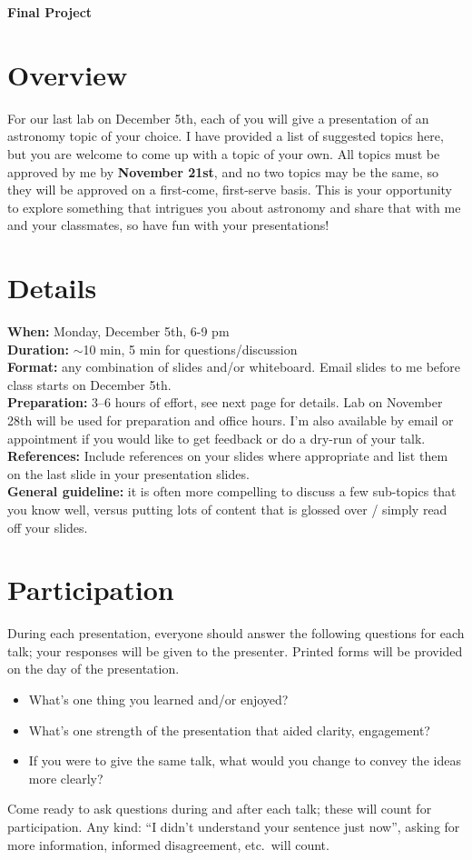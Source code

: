 \documentclass[11pt]{article}%
\begin{document}
\begin{center}
\Large\textbf{Final Project}
\end{center}

\section*{Overview}
For our last lab on December 5th, each of you will give a presentation of an astronomy topic of your
choice. I have provided a list of suggested topics here, but you are welcome to come up with a
topic of your own. All topics must be approved by me by \textbf{November 21st}, and no two topics may be the same, so they will be approved on a first-come, first-serve basis. This is your opportunity to explore something that intrigues you about astronomy and share that with me and your classmates, so have fun with your presentations! 

\section*{Details}
\textbf{When:} Monday, December 5th, 6-9 pm \\
\textbf{Duration:} $\sim$10 min, 5 min for
questions/discussion\\
\textbf{Format:} any combination of slides and/or whiteboard. Email slides to me before class starts on December 5th. \\
\textbf{Preparation:} 3--6 hours of effort, see next page for details. Lab on November 28th will be used for preparation and office hours. I'm also available by email or appointment if you would like to get feedback or do a dry-run of your talk. \\
\textbf{References:} Include references on your slides where appropriate and list them on the last slide in your presentation slides. \\
\textbf{General guideline:} it is often more compelling to discuss a few sub-topics that you know well, versus putting lots of content that is glossed over / simply read off your slides.\\

\section*{Participation}
During each presentation, everyone should answer the following questions for each talk; your responses will be given to the presenter. Printed forms will be provided on the day of the presentation.
\begin{itemize}[noitemsep]
    \item What's one thing you learned and/or enjoyed?
    \item What's one strength of the presentation that aided clarity, engagement?
    \item If you were to give the same talk, what would you change to convey
        the ideas more clearly?
\end{itemize}
Come ready to ask questions during and after each talk; these will count for
participation.  Any kind: ``I didn't understand your sentence just now'',
asking for more information, informed disagreement, etc.~will count.
\end{document}
